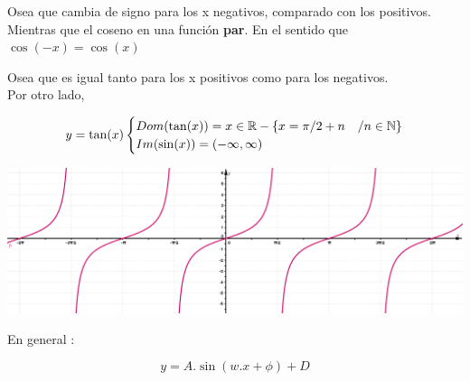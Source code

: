 \documentclass[a4paper,11pt,spanish,sans]{exam}
\begin{document}
Osea que cambia de signo  para los x  negativos, comparado con los positivos.\\

Mientras que el coseno en una función \textbf{par}. En el sentido que $\cos (-x)=\cos (x)$

Osea que es igual tanto para los x positivos como para los negativos.\\

Por otro lado, 

\begin{minipage}{0.5\linewidth}
	\[ y=\tan (x)\\
	
	\begin{cases}
		Dom(\tan (x))= x \in \mathbb{R} - \lbrace x=\pi /2+n  & / n  \in \mathbb{N} \rbrace \\ 
		Im(\sin (x))= (-\infty,\infty)\\
	\end{cases} \] 
\end{minipage}
\begin{minipage}{0.5\linewidth}
	\includegraphics[width=.95\textwidth]{tan.png}
\end{minipage}

En general : %

\[
y=A.\sin (w.x + \phi)+D
\]
\end{document}
